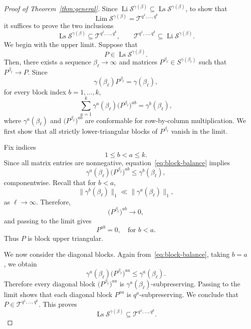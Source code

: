 \documentclass[10pt,a4paper]{amsart}
\begin{document}
			\begin{proof}[Proof of Theorem~\ref{thm:general}]
				Since $
				\operatorname*{Li}\mathcal{S}^{\gamma(\beta)}
				\subseteq
				\operatorname*{Ls}\mathcal{S}^{\gamma(\beta)}
				$,
				to show that
				$$
				\operatorname*{Lim}\mathcal{S}^{\gamma(\beta)}
				=
				\mathcal T^{q^1,\ldots,q^k}
				$$
				it suffices to prove the two inclusions
				\begin{equation}
					\label{eq:2_inclusions}
					\operatorname*{Ls}\mathcal{S}^{\gamma(\beta)}
					\subseteq
					\mathcal T^{q^1,\ldots,q^k},
					\qquad
					\mathcal T^{q^1,\ldots,q^k}
					\subseteq
					\operatorname*{Li}\mathcal{S}^{\gamma(\beta)}.
				\end{equation}
				We begin with the upper limit. Suppose that
				$$
				P\in\operatorname*{Ls}\mathcal{S}^{\gamma(\beta)}.
				$$
				Then, there exists a sequence $\beta_\ell\to\infty$ and matrices
				$P^{\beta_\ell}\in S^{\gamma(\beta_\ell)}$
				such that $P^{\beta_\ell}\to P$.
				Since
				$$
				\gamma(\beta_\ell)P^{\beta_\ell}
				=
				\gamma(\beta_\ell),
				$$
				for every block index $b=1,\ldots,k$,
				\begin{equation}
					\label{eq:block-balance}
					\sum_{a=1}^k
					\gamma^{a}(\beta_\ell)
					\bigl(P^{\beta_\ell}\bigr)^{ab}
					=
					\gamma^{b}(\beta_\ell),
				\end{equation}
				where $\gamma^{a}(\beta_\ell)$ and 
				$\bigl(P^{\beta_\ell}\bigr)^{ab}$ are conformable for row-by-column multiplication.
				We first show that all strictly lower-triangular blocks of $P^{\beta_{\ell}}$ vanish in the limit.
				
				Fix indices
				$$
				1\le b<a\le k.
				$$
				Since all matrix entries are nonnegative, equation~\eqref{eq:block-balance} implies
				$$
				\gamma^{a}(\beta_\ell)
				\bigl(P^{\beta_\ell}\bigr)^{ab}
				\le
				\gamma^{b}(\beta_\ell),
				$$
				componentwise. Recall that for $b<a$, $$\|\gamma^b(\beta_{\ell})\|_1\ll \|\gamma^a(\beta_{\ell})\|_1,$$ as $\ell\to\infty$. Therefore,
				$$
				\bigl(P^{\beta_\ell}\bigr)^{ab}\to0,
				$$
				and passing to the limit gives
				$$
				P^{ab}=0,
				\quad \text{for $b<a$}.
				$$
				Thus $P$ is block upper triangular.
				
				We now consider the diagonal blocks. Again from~\eqref{eq:block-balance},
				taking $b=a$, we obtain
				$$
				\gamma^{a}(\beta_\ell)
				\bigl(P^{\beta_\ell}\bigr)^{aa}
				\le
				\gamma^{a}(\beta_\ell).
				$$
				Therefore every diagonal block $\bigl(P^{\beta_\ell}\bigr)^{aa}$
				is $\gamma^a(\beta_{\ell})$-subpreserving. Passing to the limit shows that each diagonal block $P^{aa}$ is $q^a$-subpreserving. We conclude that $
				P\in\mathcal T^{q^1,\ldots,q^k}$.
				This proves
				$$
				\operatorname*{Ls}\mathcal{S}^{\gamma(\beta)}
				\subseteq
				\mathcal T^{q^1,\ldots,q^k}.
				$$
				

\end{proof}
\end{document}
